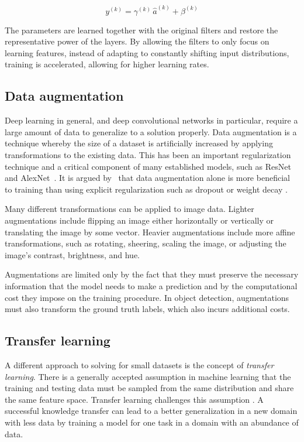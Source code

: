 \begin{equation*}
  y^{(k)}=\gamma^{(k)}\,\widehat{a}^{(k)}+\beta^{(k)}
\end{equation*}

The parameters are learned together with the original filters and restore the representative power of the layers.
By allowing the filters to only focus on learning features, instead of adapting to constantly shifting input distributions, training is accelerated, allowing for higher learning rates.

\subsection{Data augmentation}
Deep learning in general, and deep convolutional networks in particular, require a large amount of data to generalize to a solution properly.
Data augmentation is a technique whereby the size of a dataset is artificially increased by applying transformations to the existing data.
This has been an important regularization technique and a critical component of many established models, such as ResNet\ \parencite{he2015deep} and AlexNet\ \parencite{alexnet}.
It is argued by\ \citeauthor{Hern_ndez_Garc_a_2018} that data augmentation alone is more beneficial to training than using explicit regularization such as dropout or weight decay \parencite{Hern_ndez_Garc_a_2018}.

Many different transformations can be applied to image data. Lighter augmentations include flipping an image either horizontally or vertically or translating the image by some vector. Heavier augmentations include more affine transformations, such as rotating, sheering, scaling the image, or adjusting the image's contrast, brightness, and hue.

Augmentations are limited only by the fact that they must preserve the necessary information that the model needs to make a prediction and by the computational cost they impose on the training procedure. In object detection, augmentations must also transform the ground truth labels, which also incurs additional costs.

\subsection{Transfer learning}
A different approach to solving for small datasets is the concept of \textit{transfer learning}.
There is a generally accepted assumption in machine learning that the training and testing data must be sampled from the same distribution and share the same feature space. Transfer learning challenges this assumption \parencite{pan_yang_2010}.
A successful knowledge transfer can lead to a better generalization in a new domain with less data by training a model for one task in a domain with an abundance of data.

